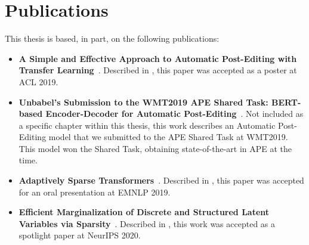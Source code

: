 \section{Publications}
\label{sec:int_publications}

\noindent This thesis is based, in part, on the following publications:

\begin{sloppypar}
      \begin{itemize}

            \item {\bf A Simple and Effective Approach to Automatic
                  Post-Editing with Transfer Learning}~\citep{Correia2019}.
                  Described in , this paper was accepted as a
                  poster at ACL 2019.
                  
            \item {\bf Unbabel's Submission to the WMT2019 APE Shared Task:
                  BERT-based Encoder-Decoder for Automatic
                  Post-Editing}~\citep{lopes2019unbabels}. Not included as a specific
                  chapter within this thesis, this work describes an Automatic
                  Post-Editing model that we submitted to the APE Shared Task at
                  WMT2019. This model won the Shared Task, obtaining state-of-the-art
                  in APE at the time.
                  
            \item {\bf Adaptively Sparse
                  Transformers}~\citep{correia2019adaptively}. Described in
                  , this paper was accepted for an oral
                  presentation at EMNLP 2019.
                  
            \item {\bf Efficient Marginalization of Discrete and Structured
                  Latent Variables via Sparsity}~\citep{correia2020procneurips}.
                  Described in , this work was
                  accepted as a spotlight paper at NeurIPS 2020.
                  
      \end{itemize}
\end{sloppypar}